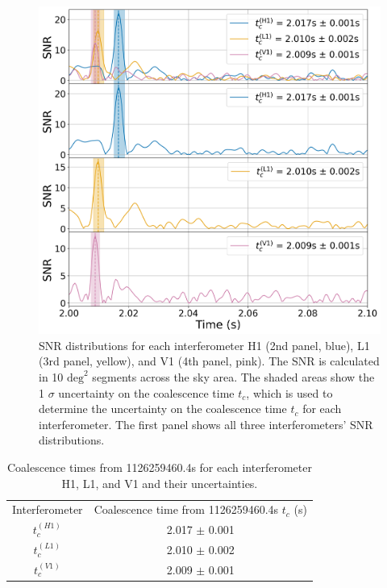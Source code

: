 \documentclass[11pt,a4paper]{article}
\begin{document}
\begin{figure}
    \includegraphics[width=\columnwidth, keepaspectratio]{../figures/SNR_HLV.png}
    \caption{SNR distributions for each interferometer H1 (2nd panel, blue), L1 (3rd panel, yellow), and V1 (4th panel, pink). The SNR is calculated in 10 $\mathrm{deg}^2$ segments across the sky area. The shaded areas show the 1 $\sigma$ uncertainty on the coalescence time $t_c$, which is used to determine the uncertainty on the coalescence time $t_c$ for each interferometer. The first panel shows all three interferometers' SNR distributions.}
    \label{fig:snr_distributions}
\end{figure}

\begin{table}[h]
    \centering
    \begin{tabular}{cc}
    Interferometer & Coalescence time from 1126259460.4s $t_c$ (s) \\
    $t_c^{(H1)}$ & 2.017 $\pm$ 0.001 \\
    $t_c^{(L1)}$ & 2.010 $\pm$ 0.002 \\
    $t_c^{(V1)}$ & 2.009 $\pm$ 0.001 \\
    \end{tabular}
    \caption{Coalescence times from 1126259460.4s for each interferometer H1, L1, and V1 and their uncertainties.}
    \label{tab:tcs}
\end{table}
\end{document}
